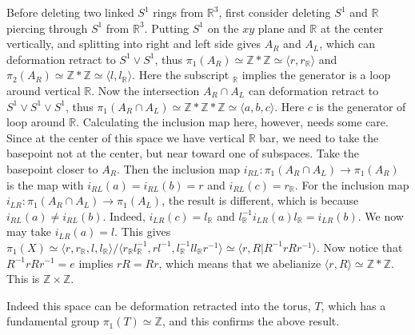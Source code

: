 \begin{exmp} Before deleting two linked $S^1$ rings from $\mathbb{R}^3$, first consider deleting $S^1$ and $\mathbb{R}$ piercing through $S^1$ from $\mathbb{R}^3$. Putting $S^1$ on the $xy$ plane and $\mathbb{R}$ at the center vertically, and splitting into right and left side gives $A_R$ and $A_L$, which can deformation retract to $S^1\vee S^1$, thus $\pi_1(A_R)\simeq \mathbb{Z}*\mathbb{Z}\simeq \langle r,r_{\mathbb{R}}\rangle$ and $\pi_2(A_R)\simeq \mathbb{Z}*\mathbb{Z}\simeq \langle l,l_{\mathbb{R}}\rangle$. Here the subscript ${}_\mathbb{R}$ implies the generator is a loop around vertical $\mathbb{R}$. Now the intersection $A_R\cap A_L$ can deformation retract to $S^1\vee S^1\vee S^1$, thus $\pi_1(A_R\cap A_L)\simeq \mathbb{Z}*\mathbb{Z}*\mathbb{Z}\simeq \langle a,b,c\rangle$. Here $c$ is the generator of loop around $\mathbb{R}$. Calculating the inclusion map here, however, needs some care. Since at the center of this space we have vertical $\mathbb{R}$ bar, we need to take the basepoint not at the center, but near toward one of subspaces. Take the basepoint closer to $A_R$. Then the inclusion map $i_{RL}:\pi_1(A_R\cap A_L)\rightarrow \pi_1(A_R)$ is the map with $i_{RL}(a)=i_{RL}(b)=r$ and $i_{RL}(c)=r_{\mathbb{R}}$. For the inclusion map $i_{LR}:\pi_1(A_R\cap A_L)\rightarrow \pi_1(A_L)$, the result is different, which is because $i_{RL}(a)\neq i_{RL}(b)$. Indeed, $i_{LR}(c)=l_{\mathbb{R}}$ and $l_{\mathbb{R}}^{-1}i_{LR}(a)l_{\mathbb{R}}=i_{LR}(b)$. We now may take $i_{LR}(a)=l$. This gives $\pi_1(X)\simeq \langle r, r_{\mathbb{R}},l,l_{\mathbb{R}}\rangle/\langle r_\mathbb{R}l_{\mathbb{R}}^{-1},rl^{-1},l_{\mathbb{R}}^{-1}ll_{\mathbb{R}}r^{-1}\rangle\simeq \langle r,R|R^{-1}rRr^{-1}\rangle$. Now notice that $R^{-1}rRr^{-1}=e$ implies $rR=Rr$, which means that we abelianize $\langle r,R\rangle\simeq \mathbb{Z}*\mathbb{Z}$. This is $\mathbb{Z}\times \mathbb{Z}$.

Indeed this space can be deformation retracted into the torus, $T$, which has a fundamental group $\pi_1(T)\simeq \mathbb{Z}$, and this confirms the above result.
\end{exmp}

